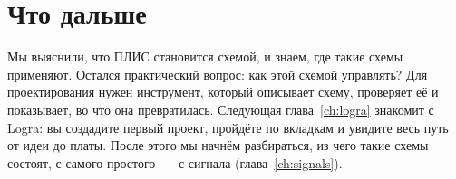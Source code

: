 \section{Что дальше}

Мы выяснили, что ПЛИС становится схемой, и знаем, где такие схемы применяют.
Остался практический вопрос: как этой схемой управлять? Для проектирования
нужен инструмент, который описывает схему, проверяет её и показывает, во что она
превратилась. Следующая глава~\ref{ch:logra} знакомит с Logra: вы создадите
первый проект, пройдёте по вкладкам и увидите весь путь от идеи до платы. После
этого мы начнём разбираться, из чего такие схемы состоят, с самого простого~---
с сигнала (глава~\ref{ch:signals}).
